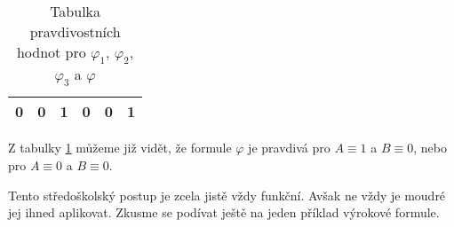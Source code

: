 \begin{example}
\begin{solution}
\begin{table}[H]
\begin{tabular}{|cc|cccc|}
            0   & 0   & 1               & 0                          & 0                    & 1                                          \\ \hline
            \end{tabular}
            \caption{Tabulka pravdivostních hodnot pro $\varphi_1$, $\varphi_2$, $\varphi_3$ a $\varphi$}
            \label{tab:ex_vyrokova_formule_1}
        \end{table}
        Z tabulky \ref{tab:ex_vyrokova_formule_1} můžeme již vidět, že formule $\varphi$ je pravdivá pro $A\equiv 1$ a $B\equiv 0$, nebo pro $A\equiv 0$ a $B\equiv 0$.
    \end{solution}
\end{example}

Tento středoškolský postup je zcela jistě vždy funkční. Avšak ne vždy je moudré jej ihned aplikovat. Zkusme se podívat ještě na jeden příklad výrokové formule.

